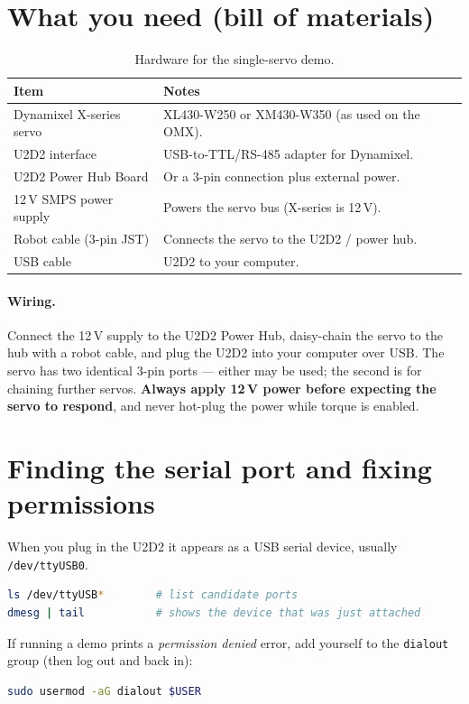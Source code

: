 \documentclass[11pt,a4paper]{article}
\begin{document}
\section{What you need (bill of materials)}
\begin{table}[h]
\centering
\begin{tabular}{@{}ll@{}}
\toprule
\textbf{Item} & \textbf{Notes} \\
\midrule
Dynamixel X-series servo & XL430-W250 or XM430-W350 (as used on the OMX). \\
U2D2 interface & USB-to-TTL/RS-485 adapter for Dynamixel. \\
U2D2 Power Hub Board & Or a 3-pin connection plus external power. \\
12\,V SMPS power supply & Powers the servo bus (X-series is 12\,V). \\
Robot cable (3-pin JST) & Connects the servo to the U2D2 / power hub. \\
USB cable & U2D2 to your computer. \\
\bottomrule
\end{tabular}
\caption{Hardware for the single-servo demo.}
\end{table}

\paragraph{Wiring.} Connect the 12\,V supply to the U2D2 Power Hub, daisy-chain
the servo to the hub with a robot cable, and plug the U2D2 into your computer over
USB. The servo has two identical 3-pin ports --- either may be used; the second is
for chaining further servos. \textbf{Always apply 12\,V power before expecting the
servo to respond}, and never hot-plug the power while torque is enabled.

\section{Finding the serial port and fixing permissions}
When you plug in the U2D2 it appears as a USB serial device, usually
\texttt{/dev/ttyUSB0}.
\begin{lstlisting}[language=bash]
ls /dev/ttyUSB*        # list candidate ports
dmesg | tail           # shows the device that was just attached
\end{lstlisting}

If running a demo prints a \emph{permission denied} error, add yourself to the
\texttt{dialout} group (then log out and back in):
\begin{lstlisting}[language=bash]
sudo usermod -aG dialout $USER
\end{lstlisting}
\end{document}
